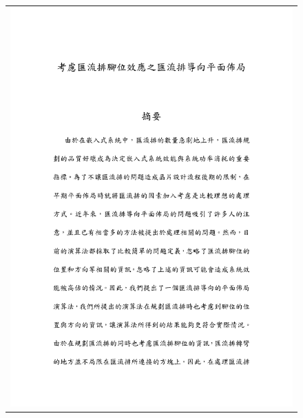%
%
\begin{figure}[h]
\centering
\vspace{-29mm}
\begin{tabular}{c}
\hspace{-36mm} \includegraphics[]{./abstract/ChineseAbstract1.pdf}
\end{tabular}
\end{figure}
\newpage
\newpage

